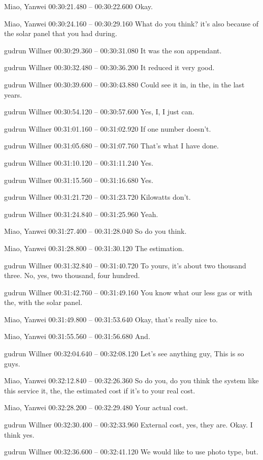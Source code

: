{Miao, Yanwei 00:30:21.480 -- 00:30:22.600
Okay.

Miao, Yanwei 00:30:24.160 -- 00:30:29.160
What do you think? it's also because of the solar panel that you had during.

gudrun Willner 00:30:29.360 -- 00:30:31.080
It was the son appendant.

gudrun Willner 00:30:32.480 -- 00:30:36.200
It reduced it very good.

gudrun Willner 00:30:39.600 -- 00:30:43.880
Could see it in, in the, in the last years.

gudrun Willner 00:30:54.120 -- 00:30:57.600
Yes, I, I just can.

gudrun Willner 00:31:01.160 -- 00:31:02.920
If one number doesn't.

gudrun Willner 00:31:05.680 -- 00:31:07.760
That's what I have done.

gudrun Willner 00:31:10.120 -- 00:31:11.240
Yes.

gudrun Willner 00:31:15.560 -- 00:31:16.680
Yes.

gudrun Willner 00:31:21.720 -- 00:31:23.720
Kilowatts don't.

gudrun Willner 00:31:24.840 -- 00:31:25.960
Yeah.

Miao, Yanwei 00:31:27.400 -- 00:31:28.040
So do you think.

Miao, Yanwei 00:31:28.800 -- 00:31:30.120
The estimation.

gudrun Willner 00:31:32.840 -- 00:31:40.720
To yours, it's about two thousand three. No, yes, two thousand, four hundred.

gudrun Willner 00:31:42.760 -- 00:31:49.160
You know what our less gas or with the, with the solar panel.

Miao, Yanwei 00:31:49.800 -- 00:31:53.640
Okay, that's really nice to.

Miao, Yanwei 00:31:55.560 -- 00:31:56.680
And.

gudrun Willner 00:32:04.640 -- 00:32:08.120
Let's see anything guy, This is so guys.

Miao, Yanwei 00:32:12.840 -- 00:32:26.360
So do you, do you think the system like this service it, the, the estimated cost if it's to your real cost.

Miao, Yanwei 00:32:28.200 -- 00:32:29.480
Your actual cost.

gudrun Willner 00:32:30.400 -- 00:32:33.960
External cost, yes, they are. Okay. I think yes.

gudrun Willner 00:32:36.600 -- 00:32:41.120
We would like to use photo type, but.

}
